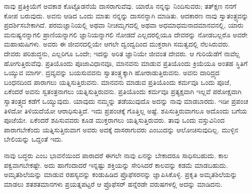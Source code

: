 \vskip 6pt

ನಾವು ಪ್ರತಿಕ್ರಿಯೆಗೆ ಅವಕಾಶ ಕೊಟ್ಟೊಡನೆಯೆ ದಾಸರಾಗುವೆವು. ಯಾರೊ ನನ್ನನ್ನು ನಿಂದಿಸುವರು; ತತ್​ಕ್ಷಣ ನನಗೆ ಕೋಪ ಬರುವುದು. ಅವನು ಆಡಿದ ಒಂದು ಮಾತು ನನ್ನನ್ನು ದಾಸನನ್ನಾಗಿ ಮಾಡಿತು. ಆದಕಾರಣ ನಾವು ಸ್ವಾತಂತ್ರ್ಯವನ್ನು ಪ್ರದರ್ಶಿಸಬೇಕಾಗಿದೆ. ಪರಮಜ್ಞಾನಿಯಲ್ಲಿ ಅಥವಾ ನೀಚಮೃಗದಲ್ಲಿ ಅಥವಾ ಅಧಮಾಧಮನಾದ\break ಮಾನವನಲ್ಲಿ, ಯಾರು ಮನುಷ್ಯನನ್ನಾಗಲಿ ಪ್ರಾಣಿಯನ್ನಾಗಲಿ ಜ್ಞಾನಿಯನ್ನಾಗಲಿ ನೋಡದೆ ಎಲ್ಲದರಲ್ಲಿಯೂ ದೇವರನ್ನು ನೋಡಬಲ್ಲರೊ ಅವರೇ ಮಹಾಋಷಿಗಳು. ಅವರು ಈ ಜೀವನದಲ್ಲಿಯೇ ಆಗಲೇ ದ್ವಂದ್ವದಿಂದ ಮುಕ್ತರಾಗಿ ಸಮತ್ವದಲ್ಲಿ ನೆಲಸಿರುವರು. ದೇವರು ಪರಿಶುದ್ಧನು, ಎಲ್ಲರಿಗೂ ಒಂದೇ; ಇದನ್ನು ಅರಿತ ಜ್ಞಾನಿಯೇ ಜೀವಂತ ದೇವರು. ಆ ಗುರಿಯೆಡೆಗೆ ನಾವೆಲ್ಲ ಹೋಗುತ್ತಿರುವೆವು. ಪ್ರತಿಯೊಂದು ಪೂಜಾವಿಧಾನವೂ, ಮಾನವನು ಮಾಡುವ ಪ್ರತಿಯೊಂದು ಕ್ರಿಯೆಯೂ ಅಂತಹ ಸ್ಥಿತಿಗೆ ಒಯ್ಯುವ ಮಾರ್ಗ. ದ್ರವ್ಯವನ್ನು ಬಯಸುವವನು ಸ್ವಾತಂತ್ರ್ಯಕ್ಕಾಗಿ ಹೋರಾಡುತ್ತಿರುವನು. ಅವನು ದಾರಿದ್ರ್ಯದ ಬಂಧನದಿಂದ ಪಾರಾಗಲು ಯತ್ನಿಸುತ್ತಿರುವನು. ಮಾನವನು ಮಾಡುವ ಪ್ರತಿಯೊಂದು ಕರ್ಮವೂ ಒಂದು ಪೂಜೆ, ಏಕೆಂದರೆ ಅವನು ಸ್ವತಂತ್ರನಾಗಲು ಯತ್ನಿಸುತ್ತಿರುವನು. ಪ್ರತಿಯೊಂದು ಕರ್ಮವೂ ಪ್ರತ್ಯಕ್ಷವಾಗಿ ಇಲ್ಲವೆ ಪರೋಕ್ಷವಾಗಿ ಸ್ವಾತಂತ್ರ್ಯದ ಕಡೆಗೆ ಒಯ್ಯುವುದು. ಯಾವುದು ನಮ್ಮನ್ನು ತಡೆಯುವುದೊ ಅದನ್ನು ನಾವು ಮಾಡಬಾರದು. ಇಡೀ ಪ್ರಪಂಚ ತಿಳಿದೋ ತಿಳಿಯದೆಯೋ ಆರಾಧಿಸುತ್ತಿದೆ. ಇದು ಪ್ರಪಂಚಕ್ಕೆ ಗೊತ್ತಿಲ್ಲ ಅಷ್ಟೆ. ಶಪಿಸುತ್ತಿರುವಾಗಲೂ ಅದೊಂದು ಬಗೆಯ ಪೂಜೆಯೇ. ಏಕೆಂದರೆ ಶಪಿಸುವವರು ಕೂಡ ಮುಕ್ತರಾಗಲು ಯತ್ನಿಸುತ್ತಿರುವರು. ತಾವು ಒಂದು ವಸ್ತುವಿನಿಂದ ಪಾರಾಗಬೇಕೆಂದು ಯತ್ನಿಸುತ್ತಿರುವಾಗ ಅವರು ಅದಕ್ಕೆ ದಾಸರಾಗುವರು ಎಂಬುದನ್ನು ಆಲೋಚಿಸುವುದಿಲ್ಲ. ಮುಳ್ಳಿನ ಬೇಲಿಯನ್ನು ಒದ್ದಂತೆ ಇದು.

\vskip 6pt

ನಾವು ಬದ್ಧರು ಎಂಬ ಭಾವನೆಯಿಂದ ಪಾರಾದರೆ ಈಗಲೇ ನಾವು ಏನನ್ನು ಬೇಕಾದರೂ ಸಾಧಿಸಬಹುದು. ಕಾಲ ಪಕ್ವವಾಗಬೇಕಷ್ಟೇ. ಅದು ಹಾಗೆಂದಾದರೆ ಇನ್ನಷ್ಟು ಶಕ್ತಿಯನ್ನು ಸೇರಿಸಿದರೆ ಕಾಲವನ್ನು ಕಡಮೆ ಮಾಡಬಹುದು. ಅಮೃತಶಿಲೆಯನ್ನು ಮಾಡುವ ರಹಸ್ಯವನ್ನು ಕಂಡುಹಿಡಿದ ಪ್ರೊಫೆಸರನನ್ನು ಜ್ಞಾಪಿಸಿಕೊಳ್ಳಿ. ಪ್ರಕೃತಿ ಅಮೃತಶಿಲೆಯನ್ನು ಮಾಡಲು ಶತಶತಮಾನಗಳು ಪ್ರಯತ್ನಪಟ್ಟರೆ ಆ ಪ್ರೊಫೆಸರ್​ ಹನ್ನೆರಡೇ ವರುಷಗಳಲ್ಲಿ ಅದನ್ನು ಮಾಡಿದನು.

